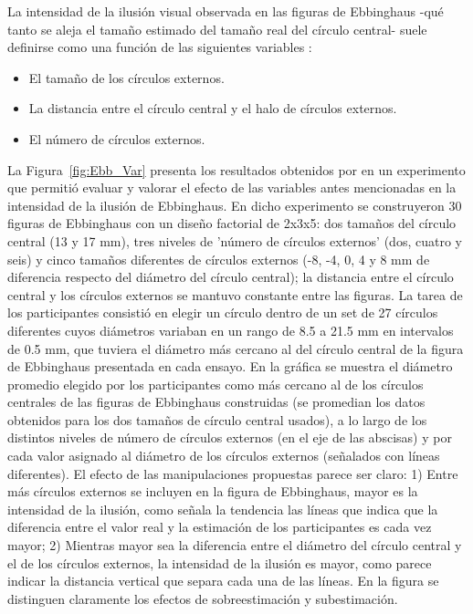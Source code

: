 La intensidad de la ilusión visual observada en las figuras de Ebbinghaus -qué tanto se aleja el tamaño estimado del tamaño real del círculo central- suele definirse como una función de las siguientes variables \parencite{Massaro1971, Girgus1972, Roberts2005}: 

\begin{itemize}
\item El tamaño de los círculos externos.
\item La distancia entre el círculo central y el halo de círculos externos.
\item El número de círculos externos.
\end{itemize}

La Figura~\ref{fig:Ebb_Var} presenta los resultados obtenidos por \parencite{Massaro1971} en un experimento que permitió evaluar y valorar el efecto de las variables antes mencionadas en la intensidad de la ilusión de Ebbinghaus. En dicho experimento se construyeron 30 figuras de Ebbinghaus con un diseño factorial de 2x3x5: dos tamaños del círculo central (13 y 17 mm), tres niveles de 'número de círculos externos' (dos, cuatro y seis) y cinco tamaños diferentes de círculos externos (-8, -4, 0, 4 y 8 mm de diferencia respecto del diámetro del círculo central); la distancia entre el círculo central y los círculos externos se mantuvo constante entre las figuras. La tarea de los participantes consistió en elegir un círculo dentro de un set de 27 círculos diferentes cuyos diámetros variaban en un rango de 8.5 a 21.5 mm en intervalos de 0.5 mm, que tuviera el diámetro más cercano al del círculo central de la figura de Ebbinghaus presentada en cada ensayo. En la gráfica se muestra el diámetro promedio elegido por los participantes como más cercano al de los círculos centrales de las figuras de Ebbinghaus construidas (se promedian los datos obtenidos para los dos tamaños de círculo central usados), a lo largo de los distintos niveles de número de círculos externos (en el eje de las abscisas) y por cada valor asignado al diámetro de los círculos externos (señalados con líneas diferentes). El efecto de las manipulaciones propuestas parece ser claro: 1) Entre más círculos externos se incluyen en la figura de Ebbinghaus, mayor es la intensidad de la ilusión, como señala la tendencia las líneas que indica que la diferencia entre el valor real y la estimación de los participantes es cada vez mayor; 2) Mientras mayor sea la diferencia entre el diámetro del círculo central y el de los círculos externos, la intensidad de la ilusión es mayor, como parece indicar la distancia vertical que separa cada una de las líneas. En la figura se distinguen claramente los efectos de sobreestimación y subestimación.\\

